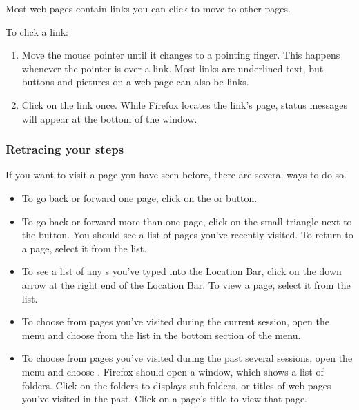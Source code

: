 Most web pages contain links you can click to move to other pages.

To click a link:

\begin{enumerate}
  \item Move the mouse pointer until it changes to a pointing finger. 
This happens whenever the pointer is over a link. Most links are underlined 
text, but buttons and pictures on a web page can also be links.
  \item Click on the link once. While Firefox locates the link's page, 
status messages will appear at the bottom of the window.
\end{enumerate}

\subsubsection{Retracing your steps}

If you want to visit a page you have seen before, there are several 
ways to do so.

\begin{itemize}
  \item To go back or forward one page, click on the  or 
 button.
  \item To go back or forward more than one page, click on the small triangle 
next to the  button. You should see a list of 
pages you've recently visited. To return to a page, select it from the list.
  \item To see a list of any s you've typed into the Location Bar, 
click on the down arrow at the right end of the Location Bar. To view a page, 
select it from the list.
  \item To choose from pages you've visited during the current session, 
open the  menu and choose from the list in the bottom section 
of the menu.
  \item To choose from pages you've visited during the past several sessions, 
open the  menu and choose . 
Firefox should open a  window, which shows a list of folders. 
Click on the folders to displays sub-folders, or titles of web pages you've 
visited in the past. Click on a page's title to view that page.
\end{itemize} 

